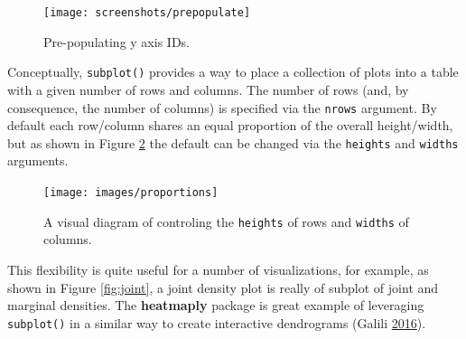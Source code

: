 \documentclass[12pt,]{isuthesis}
\newenvironment{Shaded}{\begin{snugshade}}{\end{snugshade}}
\newcommand{\KeywordTok}[1]{\textcolor[rgb]{0.13,0.29,0.53}{\textbf{{#1}}}}
\newcommand{\DataTypeTok}[1]{\textcolor[rgb]{0.13,0.29,0.53}{{#1}}}
\newcommand{\DecValTok}[1]{\textcolor[rgb]{0.00,0.00,0.81}{{#1}}}
\newcommand{\StringTok}[1]{\textcolor[rgb]{0.31,0.60,0.02}{{#1}}}
\newcommand{\OtherTok}[1]{\textcolor[rgb]{0.56,0.35,0.01}{{#1}}}
\newcommand{\NormalTok}[1]{{#1}}
\begin{document}
\begin{Shaded}
\end{Shaded}

\begin{figure}
\centering
\texttt{[image: screenshots/prepopulate]}
\caption{\label{fig:prepopulate}Pre-populating y axis IDs.}
\end{figure}

Conceptually, \texttt{subplot()} provides a way to place a collection of
plots into a table with a given number of rows and columns. The number
of rows (and, by consequence, the number of columns) is specified via
the \texttt{nrows} argument. By default each row/column shares an equal
proportion of the overall height/width, but as shown in Figure
\ref{fig:proportions} the default can be changed via the
\texttt{heights} and \texttt{widths} arguments.

\begin{figure}
\centering
\texttt{[image: images/proportions]}
\caption{\label{fig:proportions}A visual diagram of controling the
\texttt{heights} of rows and \texttt{widths} of columns.}
\end{figure}

This flexibility is quite useful for a number of visualizations, for
example, as shown in Figure \ref{fig:joint}, a joint density plot is
really of subplot of joint and marginal densities. The
\textbf{heatmaply} package is great example of leveraging
\texttt{subplot()} in a similar way to create interactive dendrograms
(Galili \protect\hyperlink{ref-heatmaply}{2016}).
\end{document}
